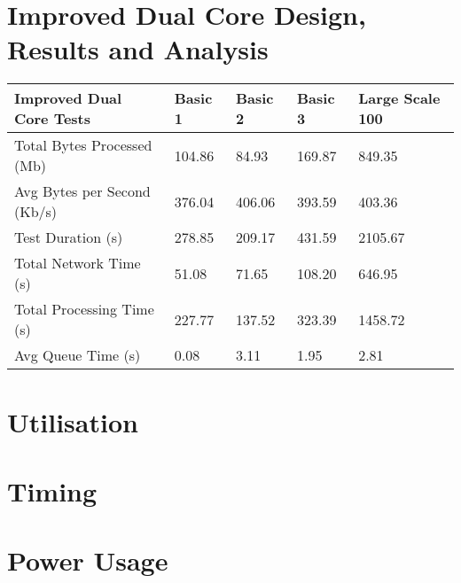 \section{Improved Dual Core Design, Results and Analysis}
\begin{table}[!ht]
    \centering
    \begin{tabular}{|l|l|l|l|l|}
    \hline
        Improved Dual Core Tests & Basic 1 & Basic 2 & Basic 3 & Large Scale 100 \\ \hline
        Total Bytes Processed (Mb) & 104.86 & 84.93 & 169.87 & 849.35 \\ \hline
        Avg Bytes per Second (Kb/s) & 376.04 & 406.06 & 393.59 & 403.36 \\ \hline
        Test Duration (s) & 278.85 & 209.17 & 431.59 & 2105.67 \\ \hline
        Total Network Time (s) & 51.08 & 71.65 & 108.20 & 646.95 \\ \hline
        Total Processing Time (s) & 227.77 & 137.52 & 323.39 & 1458.72 \\ \hline
        Avg Queue Time (s) & 0.08 & 3.11 & 1.95 & 2.81 \\ \hline
    \end{tabular}
\end{table}
\section{Utilisation}
\section{Timing}
\section{Power Usage}